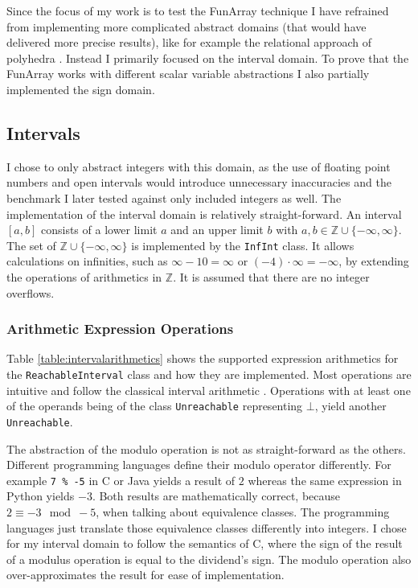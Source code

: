 Since the focus of my work is to test the FunArray technique I have refrained from implementing more complicated abstract domains (that would have delivered more precise results), like for example the relational approach of polyhedra \cite{cousot1978}. Instead I primarily focused on the interval domain. To prove that the FunArray works with different scalar variable abstractions I also partially implemented the sign domain.

\subsection{Intervals}
I chose to only abstract integers with this domain, as the use of floating point numbers and open intervals would introduce unnecessary inaccuracies and the benchmark I later tested against only included integers as well. The implementation of the interval domain is relatively straight-forward. An interval $[a,b]$ consists of a lower limit $a$ and an upper limit $b$ with $a,b \in \mathbb{Z}\cup\{-\infty,\infty\}$. The set of $\mathbb{Z}\cup\{-\infty,\infty\}$ is implemented by the \texttt{InfInt} class. It allows calculations on infinities, such as $\infty - 10 = \infty$ or $(-4) \cdot \infty = -\infty$, by extending the operations of arithmetics in $\mathbb{Z}$. It is assumed that there are no integer overflows.

\subsubsection{Arithmetic Expression Operations}
Table \ref{table:intervalarithmetics} shows the supported expression arithmetics for the \texttt{ReachableInterval} class and how they are implemented. Most operations are intuitive and follow the classical interval arithmetic \cite{dawood2011}. Operations with at least one of the operands being of the class \texttt{Unreachable} representing $\bot$, yield another \texttt{Unreachable}. 

The abstraction of the modulo operation is not as straight-forward as the others. Different programming languages define their modulo operator differently. For example \texttt{7 \% -5} in C or Java yields a result of $2$ whereas the same expression in Python yields $-3$. Both results are mathematically correct, because $2 \equiv -3 \mod -5$, when talking about equivalence classes. The programming languages just translate those equivalence classes differently into integers. I chose for my interval domain to follow the semantics of C, where the sign of the result of a modulus operation is equal to the dividend's sign. The modulo operation also over-approximates the result for ease of implementation.

